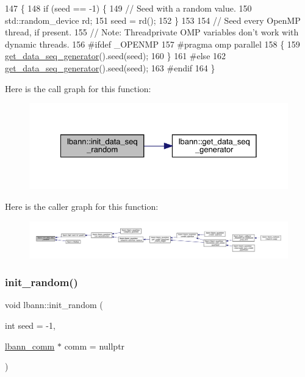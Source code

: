 \begin{DoxyCode}
147                                     \{
148   \textcolor{keywordflow}{if} (seed == -1) \{
149     \textcolor{comment}{// Seed with a random value.}
150     std::random\_device rd;
151     seed = rd();
152   \}
153 
154   \textcolor{comment}{// Seed every OpenMP thread, if present.}
155   \textcolor{comment}{// Note: Threadprivate OMP variables don't work with dynamic threads.}
156 \textcolor{preprocessor}{#ifdef \_OPENMP}
157 \textcolor{preprocessor}{  #pragma omp parallel}
158   \{
159     \hyperlink{namespacelbann_aba9d11cb3a739cd84e7234ceeb32d098}{get\_data\_seq\_generator}().seed(seed);
160   \}
161 \textcolor{preprocessor}{#else}
162   \hyperlink{namespacelbann_aba9d11cb3a739cd84e7234ceeb32d098}{get\_data\_seq\_generator}().seed(seed);
163 \textcolor{preprocessor}{#endif}
164 \}
\end{DoxyCode}
Here is the call graph for this function\+:\nopagebreak
\begin{figure}[H]
\begin{center}
\leavevmode
\includegraphics[width=328pt]{namespacelbann_a8987701a637ff0e678114aa77e9c4d40_cgraph}
\end{center}
\end{figure}
Here is the caller graph for this function\+:\nopagebreak
\begin{figure}[H]
\begin{center}
\leavevmode
\includegraphics[width=350pt]{namespacelbann_a8987701a637ff0e678114aa77e9c4d40_icgraph}
\end{center}
\end{figure}
\mbox{\label{namespacelbann_acef152f20e422b3aea1a3c1691a533ac}} 
\subsubsection{\texorpdfstring{init\+\_\+random()}{init\_random()}}
{\footnotesize\ttfamily void lbann\+::init\+\_\+random (\begin{DoxyParamCaption}\item[{int}]{seed = {\ttfamily -\/1},  }\item[{\hyperlink{classlbann_1_1lbann__comm}{lbann\+\_\+comm} $\ast$}]{comm = {\ttfamily nullptr} }\end{DoxyParamCaption})}

